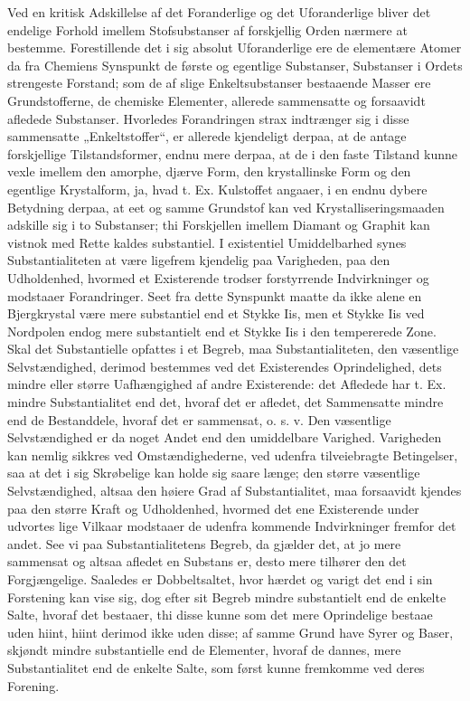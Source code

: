 \documentclass[12pt,a4paper]{book}
\begin{document}
Ved en kritisk Adskillelse af det Foranderlige og det
Uforanderlige bliver det endelige Forhold imellem Stofsubstanser
af forskjellig Orden nærmere at bestemme. Forestillende det
i sig absolut Uforanderlige ere de elementære Atomer da
fra Chemiens Synspunkt de første og egentlige Substanser,
Substanser i Ordets strengeste Forstand; som de af slige
Enkeltsubstanser bestaaende Masser ere Grundstofferne, de
chemiske Elementer, allerede sammensatte og forsaavidt afledede
Substanser. Hvorledes Forandringen strax indtrænger sig i
disse sammensatte „Enkeltstoffer“, er allerede kjendeligt derpaa,
at de antage forskjellige Tilstandsformer, endnu mere derpaa,
at de i den faste Tilstand kunne vexle imellem den amorphe,
djærve Form, den krystallinske Form og den egentlige
Krystalform, ja, hvad t. Ex. Kulstoffet angaaer, i en endnu dybere
Betydning derpaa, at eet og samme Grundstof kan ved
Krystalliseringsmaaden adskille sig i to Substanser; thi Forskjellen
imellem Diamant og Graphit kan vistnok med Rette kaldes
substantiel.
I existentiel Umiddelbarhed synes Substantialiteten at
være ligefrem kjendelig paa Varigheden, paa den Udholdenhed,
hvormed et Existerende trodser forstyrrende Indvirkninger
og modstaaer Forandringer. Seet fra dette Synspunkt maatte
da ikke alene en Bjergkrystal være mere substantiel end et Stykke
Iis, men et Stykke Iis ved Nordpolen endog mere substantielt
end et Stykke Iis i den tempererede Zone. Skal det
Substantielle opfattes i et Begreb, maa Substantialiteten, den
væsentlige Selvstændighed, derimod bestemmes ved det Existerendes
Oprindelighed, dets mindre eller større Uafhængighed af andre
Existerende: det Afledede har t. Ex. mindre Substantialitet
end det, hvoraf det er afledet, det Sammensatte mindre end
de Bestanddele, hvoraf det er sammensat, o. s. v. Den
væsentlige Selvstændighed er da noget Andet end den umiddelbare
Varighed. Varigheden kan nemlig sikkres ved Omstændighederne,
ved udenfra tilveiebragte Betingelser, saa at det i sig
Skrøbelige kan holde sig saare længe; den større væsentlige
Selvstændighed, altsaa den høiere Grad af Substantialitet,
maa forsaavidt kjendes paa den større Kraft og Udholdenhed,
hvormed det ene Existerende under udvortes lige Vilkaar
modstaaer de udenfra kommende Indvirkninger fremfor det
andet. See vi paa Substantialitetens Begreb, da gjælder
det, at jo mere sammensat og altsaa afledet en Substans
er, desto mere tilhører den det Forgjængelige. Saaledes er
Dobbeltsaltet, hvor hærdet og varigt det end i sin Forstening
kan vise sig, dog efter sit Begreb mindre substantielt end de
enkelte Salte, hvoraf det bestaaer, thi disse kunne som det
mere Oprindelige bestaae uden hiint, hiint derimod ikke uden
disse; af samme Grund have Syrer og Baser, skjøndt mindre
substantielle end de Elementer, hvoraf de dannes, mere
Substantialitet end de enkelte Salte, som først kunne fremkomme
ved deres Forening.
\end{document}
